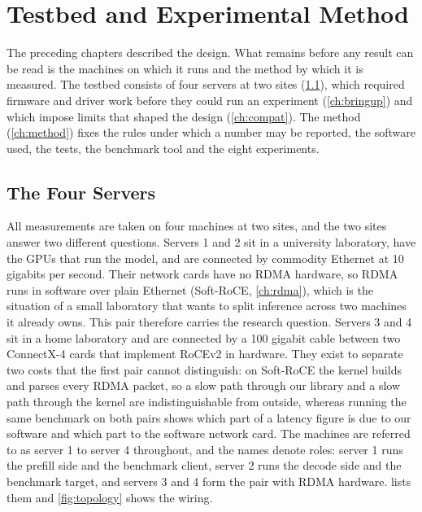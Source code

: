 \chapter{Testbed and Experimental Method}
\label{ch:testbed}

The preceding chapters described the design. What remains before any result
can be read is the machines on which it runs and the method by which it is
measured. The
testbed consists of four servers at two sites (\cref{ch:servers}), which
required firmware and driver work before they could run an experiment
(\cref{ch:bringup}) and which impose limits that shaped the design
(\cref{ch:compat}). The method (\cref{ch:method}) fixes the rules under
which a number may be reported, the software used, the tests, the benchmark
tool and the eight experiments.

\section{The Four Servers}
\label{ch:servers}

All measurements are taken on four machines at two sites, and the two sites
answer two different questions. Servers 1 and 2 sit in a university
laboratory, have the GPUs that run the model, and are connected by commodity
Ethernet at 10 gigabits per second. Their network cards have no RDMA hardware, so RDMA runs
in software over plain Ethernet (Soft-RoCE, \cref{ch:rdma}), which is the
situation of a small laboratory that wants to split inference across two
machines it already owns. This pair therefore carries the research question.
Servers 3 and 4 sit in a home laboratory and are connected by a 100 gigabit
cable between two ConnectX-4 cards that implement RoCEv2 in hardware. They
exist to separate two costs that the first pair cannot distinguish: on
Soft-RoCE the kernel builds and parses every RDMA packet, so a slow path
through our library and a slow path through the kernel are indistinguishable
from outside, whereas running the same benchmark on both pairs shows which
part of a latency figure is due to our software and which part to the
software network card. The machines are referred to as server 1 to server 4
throughout, and the names denote roles: server 1 runs the prefill side and
the benchmark client, server 2 runs the decode side and the benchmark target,
and servers 3 and 4 form the pair with RDMA hardware. 
lists them and \cref{fig:topology} shows the wiring.


